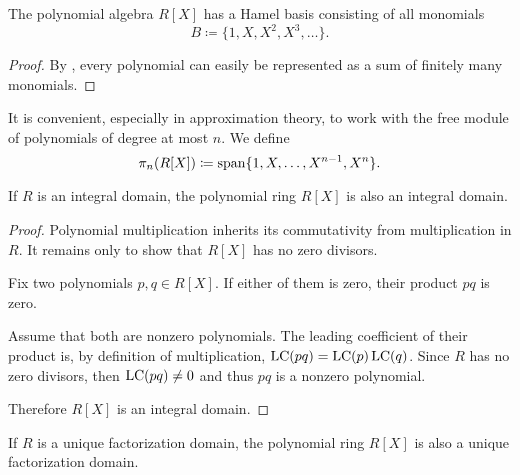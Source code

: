 \begin{proposition}\label{thm:polynomial_algebra_basis}
  The polynomial algebra \( R[X] \) has a Hamel basis consisting of all monomials
  \begin{equation*}
    B \coloneqq \{ 1, X, X^2, X^3, \ldots \}.
  \end{equation*}
\end{proposition}
\begin{proof}
  By , every polynomial can easily be represented as a sum of finitely many monomials.
\end{proof}

\begin{definition}\label{def:polynomial_free_module}
  It is convenient, especially in approximation theory, to work with the free module of polynomials of degree at most \( n \). We define
  \begin{equation*}
    \pi_n(R[X]) \coloneqq \operatorname{span} \{ 1, X, \ldots, X^{n-1}, X^n \}.
  \end{equation*}
\end{definition}

\begin{proposition}\label{thm:polynomials_over_integral_domain_are_integral_domain}
  If \( R \) is an integral domain, the polynomial ring \( R[X] \) is also an integral domain.
\end{proposition}
\begin{proof}
  Polynomial multiplication inherits its commutativity from multiplication in \( R \). It remains only to show that \( R[X] \) has no zero divisors.

  Fix two polynomials \( p, q \in R[X] \). If either of them is zero, their product \( pq \) is zero.

  Assume that both are nonzero polynomials. The leading coefficient of their product is, by definition of multiplication, \( \operatorname{LC}(pq) = \operatorname{LC}(p) \operatorname{LC}(q) \). Since \( R \) has no zero divisors, then \( \operatorname{LC}(pq) \neq 0 \) and thus \( pq \) is a nonzero polynomial.

  Therefore \( R[X] \) is an integral domain.
\end{proof}

\begin{proposition}\label{thm:polynomials_over_unique_factorization_domain_are_unique_factorization_domain}
  If \( R \) is a unique factorization domain, the polynomial ring \( R[X] \) is also a unique factorization domain.
\end{proposition}

